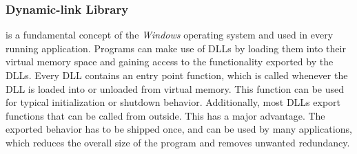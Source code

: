 \subsubsection{Dynamic-link Library}
 is a fundamental concept of the \emph{Windows} operating system and used in every running application. Programs can make use of \glspl{DLL} by loading them into their virtual memory space and gaining access to the functionality exported by the \glspl{DLL}. Every \gls{DLL} contains an entry point function, which is called whenever the \gls{DLL} is loaded into or unloaded from virtual memory. This function can be used for typical initialization or shutdown behavior. Additionally, most \glspl{DLL} export functions that can be called from outside. This has a major advantage. The exported behavior has to be shipped once, and can be used by many applications, which reduces the overall size of the program and removes unwanted redundancy.